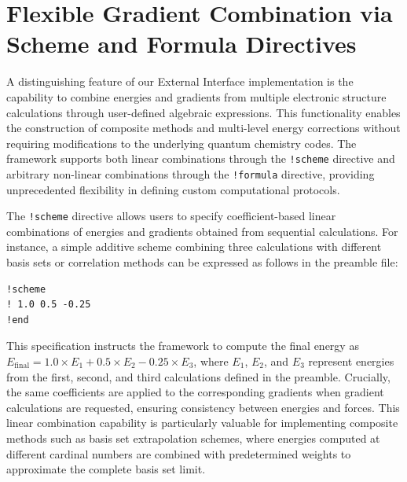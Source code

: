 \section{Flexible Gradient Combination via Scheme and Formula Directives}

A distinguishing feature of our External Interface implementation is the capability to combine energies and gradients from multiple electronic structure calculations through user-defined algebraic expressions. This functionality enables the construction of composite methods and multi-level energy corrections without requiring modifications to the underlying quantum chemistry codes. The framework supports both linear combinations through the \texttt{!scheme} directive and arbitrary non-linear combinations through the \texttt{!formula} directive, providing unprecedented flexibility in defining custom computational protocols.

The \texttt{!scheme} directive allows users to specify coefficient-based linear combinations of energies and gradients obtained from sequential calculations. For instance, a simple additive scheme combining three calculations with different basis sets or correlation methods can be expressed as follows in the preamble file:
\begin{verbatim}
!scheme
! 1.0 0.5 -0.25
!end
\end{verbatim}
This specification instructs the framework to compute the final energy as $E_{\text{final}} = 1.0 \times E_1 + 0.5 \times E_2 - 0.25 \times E_3$, where $E_1$, $E_2$, and $E_3$ represent energies from the first, second, and third calculations defined in the preamble. Crucially, the same coefficients are applied to the corresponding gradients when gradient calculations are requested, ensuring consistency between energies and forces. This linear combination capability is particularly valuable for implementing composite methods such as basis set extrapolation schemes, where energies computed at different cardinal numbers are combined with predetermined weights to approximate the complete basis set limit.

